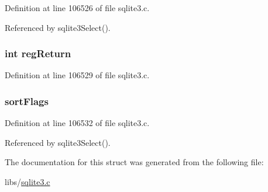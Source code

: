 Definition at line 106526 of file sqlite3.\+c.



Referenced by sqlite3\+Select().

\hypertarget{struct_sort_ctx_a02d21bd92b68681173d2e26e9525d0ae}{}
\subsubsection[{reg\+Return}]{\setlength{\rightskip}{0pt plus 5cm}int reg\+Return}\label{struct_sort_ctx_a02d21bd92b68681173d2e26e9525d0ae}


Definition at line 106529 of file sqlite3.\+c.

\hypertarget{struct_sort_ctx_a4ecd70526db6172f0af238c6f66ffef1}{}
\subsubsection[{sort\+Flags}]{ sort\+Flags}\label{struct_sort_ctx_a4ecd70526db6172f0af238c6f66ffef1}


Definition at line 106532 of file sqlite3.\+c.



Referenced by sqlite3\+Select().



The documentation for this struct was generated from the following file\+:\begin{DoxyCompactItemize}
\item 
libs/\hyperlink{sqlite3_8c}{sqlite3.\+c}\end{DoxyCompactItemize}
